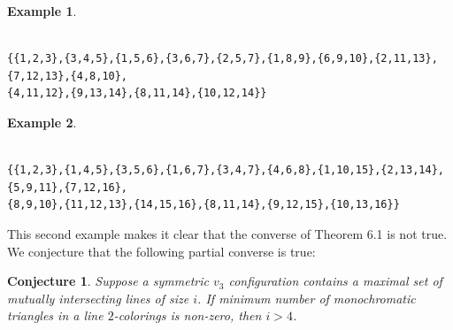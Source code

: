 \documentclass{article}
\newtheorem{conj}[thm]{Conjecture}
\theoremstyle{definition}
\newtheorem{exmp}{Example}[section]
\theoremstyle{remark}
\theoremstyle{definition}
\begin{document}
\begin{exmp}
\begin{verbatim}
    
{{1,2,3},{3,4,5},{1,5,6},{3,6,7},{2,5,7},{1,8,9},{6,9,10},{2,11,13},{7,12,13},{4,8,10},
{4,11,12},{9,13,14},{8,11,14},{10,12,14}}
\end{verbatim}

\end{exmp}

\begin{exmp}
\begin{verbatim}

{{1,2,3},{1,4,5},{3,5,6},{1,6,7},{3,4,7},{4,6,8},{1,10,15},{2,13,14},{5,9,11},{7,12,16},
{8,9,10},{11,12,13},{14,15,16},{8,11,14},{9,12,15},{10,13,16}}
\end{verbatim}
\end{exmp}

This second example makes it clear that the converse of Theorem 6.1 is not true. We conjecture that the following partial converse is true:

\begin{conj}
Suppose a symmetric $v_{3}$ configuration contains a maximal set of mutually intersecting lines of size $i$. If minimum number of monochromatic triangles in a line $2$-colorings is non-zero, then $i>4$.
\end{conj}





  
 
\end{document}
